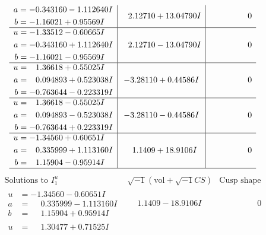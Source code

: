 \documentclass[1p]{elsarticle_modified}
\theoremstyle{definition}
\newcommand{\I}{\sqrt{-1}}
\begin{document}
$$\begin{array}{c|c|c}
\begin{aligned}
a &= -0.343160 - 1.112640 I \\
b &= -1.16021 + 0.95569 I\end{aligned}
 & \phantom{-}2.12710 + 13.04790 I & \phantom{-0.000000 } 0 \\ \hline\begin{aligned}
u &= -1.33512 - 0.60665 I \\
a &= -0.343160 + 1.112640 I \\
b &= -1.16021 - 0.95569 I\end{aligned}
 & \phantom{-}2.12710 - 13.04790 I & \phantom{-0.000000 } 0 \\ \hline\begin{aligned}
u &= \phantom{-}1.36618 + 0.55025 I \\
a &= \phantom{-}0.094893 + 0.523038 I \\
b &= -0.763644 - 0.223319 I\end{aligned}
 & -3.28110 + 0.44586 I & \phantom{-0.000000 } 0 \\ \hline\begin{aligned}
u &= \phantom{-}1.36618 - 0.55025 I \\
a &= \phantom{-}0.094893 - 0.523038 I \\
b &= -0.763644 + 0.223319 I\end{aligned}
 & -3.28110 - 0.44586 I & \phantom{-0.000000 } 0 \\ \hline\begin{aligned}
u &= -1.34560 + 0.60651 I \\
a &= \phantom{-}0.335999 + 1.113160 I \\
b &= \phantom{-}1.15904 - 0.95914 I\end{aligned}
 & \phantom{-}1.1409 + 18.9106 I & \phantom{-0.000000 } 0\\
 \hline 
 \end{array}$$\newpage$$\begin{array}{c|c|c}  
\text{Solutions to }I^u_{1}& \I (\text{vol} + \sqrt{-1}CS) & \text{Cusp shape}\\
 \hline 
\begin{aligned}
u &= -1.34560 - 0.60651 I \\
a &= \phantom{-}0.335999 - 1.113160 I \\
b &= \phantom{-}1.15904 + 0.95914 I\end{aligned}
 & \phantom{-}1.1409 - 18.9106 I & \phantom{-0.000000 } 0 \\ \hline\begin{aligned}
u &= \phantom{-}1.30477 + 0.71525 I \\

\end{aligned}
\end{array}$$
\end{document}

